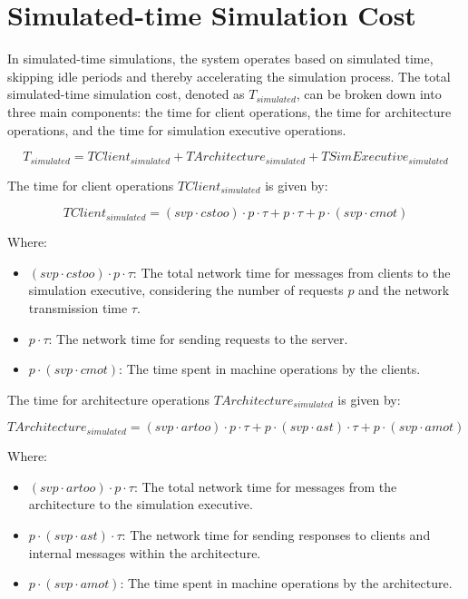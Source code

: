 \section{Simulated-time Simulation Cost}

In simulated-time simulations, the system operates based on simulated time, skipping idle periods and thereby accelerating the simulation process. The total simulated-time simulation cost, denoted as \( T_{simulated} \), can be broken down into three main components: the time for client operations, the time for architecture operations, and the time for simulation executive operations.

\[
    T_{simulated} = TClient_{simulated} + TArchitecture_{simulated} + TSimExecutive_{simulated}
\]

The time for client operations \( TClient_{simulated} \) is given by:

\[
    TClient_{simulated} = (svp \cdot cstoo) \cdot p \cdot \tau + p \cdot \tau + p \cdot (svp \cdot cmot)
\]

Where:
\begin{itemize}
    \item \( (svp \cdot cstoo) \cdot p \cdot \tau \): The total network time for messages from clients to the simulation executive, considering the number of requests \( p \) and the network transmission time \( \tau \).
    \item \( p \cdot \tau \): The network time for sending requests to the server.
    \item \( p \cdot (svp \cdot cmot) \): The time spent in machine operations by the clients.
\end{itemize}

The time for architecture operations \( TArchitecture_{simulated} \) is given by:

\[
    TArchitecture_{simulated} = (svp \cdot artoo) \cdot p \cdot \tau + p \cdot (svp \cdot ast) \cdot \tau + p \cdot (svp \cdot amot)
\]

Where:
\begin{itemize}
    \item \( (svp \cdot artoo) \cdot p \cdot \tau \): The total network time for messages from the architecture to the simulation executive.
    \item \( p \cdot (svp \cdot ast) \cdot \tau \): The network time for sending responses to clients and internal messages within the architecture.
    \item \( p \cdot (svp \cdot amot) \): The time spent in machine operations by the architecture.
\end{itemize}

